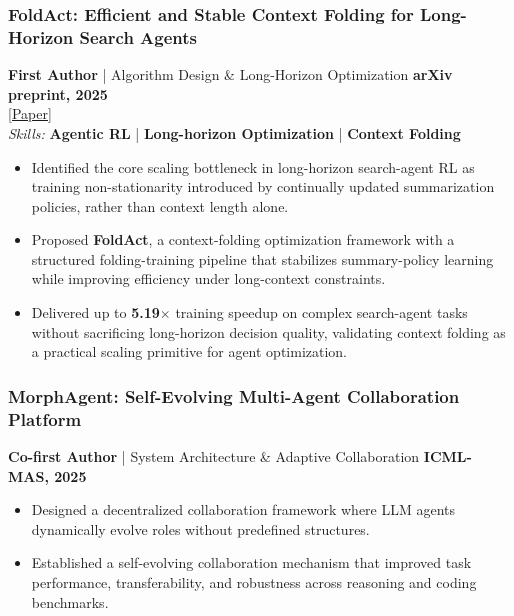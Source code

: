 \documentclass[10pt,a4paper]{article}
\begin{document}
\subsubsection*{\color{itemcolor}FoldAct: Efficient and Stable Context Folding for Long-Horizon Search Agents}
\noindent\textbf{\color{sectioncolor}First Author} | Algorithm Design \& Long-Horizon Optimization \hfill \color{accentcolor}\textbf{arXiv preprint, 2025} \\
\noindent\href{https://arxiv.org/abs/2512.22733}{\color{linkcolor}[Paper]} \\
\noindent\textit{\color{graytext}Skills:} \textbf{Agentic RL} | \textbf{Long-horizon Optimization} | \textbf{Context Folding}
\begin{itemize}[leftmargin=*]
    \item Identified the core scaling bottleneck in long-horizon search-agent RL as training non-stationarity introduced by continually updated summarization policies, rather than context length alone.
    \item Proposed \textbf{FoldAct}, a context-folding optimization framework with a structured folding-training pipeline that stabilizes summary-policy learning while improving efficiency under long-context constraints.
    \item Delivered up to \textbf{5.19$\times$} training speedup on complex search-agent tasks without sacrificing long-horizon decision quality, validating context folding as a practical scaling primitive for agent optimization.
\end{itemize}
\vspace{0.3em}

\subsubsection*{\color{itemcolor}MorphAgent: Self-Evolving Multi-Agent Collaboration Platform}
\noindent\textbf{\color{sectioncolor}Co-first Author} | System Architecture \& Adaptive Collaboration \hfill \color{accentcolor}\textbf{ICML-MAS, 2025}
\begin{itemize}[leftmargin=*]
    \item Designed a decentralized collaboration framework where LLM agents dynamically evolve roles without predefined structures.
    \item Established a self-evolving collaboration mechanism that improved task performance, transferability, and robustness across reasoning and coding benchmarks.
\end{itemize}
\end{document}
